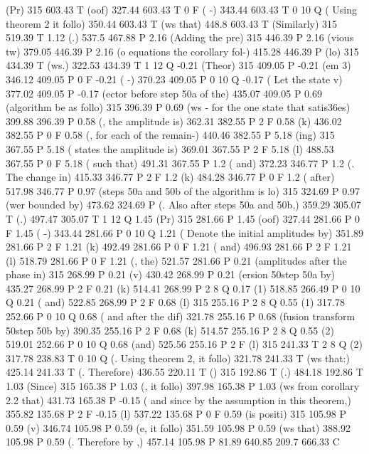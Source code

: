 (Pr) 315 603.43 T
(oof) 327.44 603.43 T
0 F
( -) 343.44 603.43 T
0 10 Q
( Using theorem 2 it follo) 350.44 603.43 T
(ws that) 448.8 603.43 T
(Similarly) 315 519.39 T
1.12 (.) 537.5 467.88 P
2.16 (Adding the pre) 315 446.39 P
2.16 (vious tw) 379.05 446.39 P
2.16 (o equations the corollary fol-) 415.28 446.39 P
(lo) 315 434.39 T
(ws.) 322.53 434.39 T
1 12 Q
-0.21 (Theor) 315 409.05 P
-0.21 (em 3) 346.12 409.05 P
0 F
-0.21 ( -) 370.23 409.05 P
0 10 Q
-0.17 ( Let the state v) 377.02 409.05 P
-0.17 (ector before step \050a of the) 435.07 409.05 P
0.69 (algorithm be as follo) 315 396.39 P
0.69 (ws - for the one state that satis\336es) 399.88 396.39 P
0.58 (, the amplitude is) 362.31 382.55 P
2 F
0.58 (k) 436.02 382.55 P
0 F
0.58 (, for each of the remain-) 440.46 382.55 P
5.18 (ing) 315 367.55 P
5.18 ( states the amplitude is) 369.01 367.55 P
2 F
5.18 (l) 488.53 367.55 P
0 F
5.18 ( such that) 491.31 367.55 P
1.2 ( and) 372.23 346.77 P
1.2 (. The change in) 415.33 346.77 P
2 F
1.2 (k) 484.28 346.77 P
0 F
1.2 ( after) 517.98 346.77 P
0.97 (steps \050a and \050b of the algorithm is lo) 315 324.69 P
0.97 (wer bounded by) 473.62 324.69 P
(. Also after steps \050a and \050b,) 359.29 305.07 T
(.) 497.47 305.07 T
1 12 Q
1.45 (Pr) 315 281.66 P
1.45 (oof) 327.44 281.66 P
0 F
1.45 ( -) 343.44 281.66 P
0 10 Q
1.21 ( Denote the initial amplitudes by) 351.89 281.66 P
2 F
1.21 (k) 492.49 281.66 P
0 F
1.21 ( and) 496.93 281.66 P
2 F
1.21 (l) 518.79 281.66 P
0 F
1.21 (, the) 521.57 281.66 P
0.21 (amplitudes after the phase in) 315 268.99 P
0.21 (v) 430.42 268.99 P
0.21 (ersion \050step \050a by) 435.27 268.99 P
2 F
0.21 (k) 514.41 268.99 P
2 8 Q
0.17 (1) 518.85 266.49 P
0 10 Q
0.21 ( and) 522.85 268.99 P
2 F
0.68 (l) 315 255.16 P
2 8 Q
0.55 (1) 317.78 252.66 P
0 10 Q
0.68 ( and after the dif) 321.78 255.16 P
0.68 (fusion transform \050step \050b by) 390.35 255.16 P
2 F
0.68 (k) 514.57 255.16 P
2 8 Q
0.55 (2) 519.01 252.66 P
0 10 Q
0.68 (and) 525.56 255.16 P
2 F
(l) 315 241.33 T
2 8 Q
(2) 317.78 238.83 T
0 10 Q
(. Using theorem 2, it follo) 321.78 241.33 T
(ws that:) 425.14 241.33 T
(. Therefore) 436.55 220.11 T
() 315 192.86 T
(.) 484.18 192.86 T
1.03 (Since) 315 165.38 P
1.03 (, it follo) 397.98 165.38 P
1.03 (ws from corollary 2.2 that) 431.73 165.38 P
-0.15 ( and since by the assumption in this theorem,) 355.82 135.68 P
2 F
-0.15 (l) 537.22 135.68 P
0 F
0.59 (is positi) 315 105.98 P
0.59 (v) 346.74 105.98 P
0.59 (e, it follo) 351.59 105.98 P
0.59 (ws that) 388.92 105.98 P
0.59 (. Therefore by ,) 457.14 105.98 P
81.89 640.85 209.7 666.33 C
